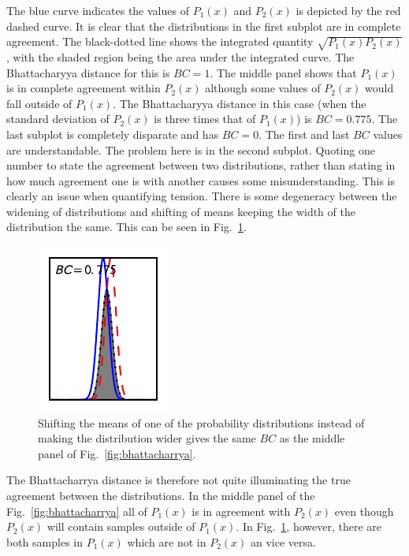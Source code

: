 \documentclass[twocolumn]{revtex4-1}
\begin{document}
    \noindent The blue curve indicates the values of $P_1(x)$ and $P_2(x)$ is depicted by the red dashed curve.
    It is clear that the distributions in the first subplot are in complete agreement.
    The black-dotted line shows the integrated quantity $\sqrt{P_1(x)P_2(x)}$, with the shaded region being the area under the integrated curve.
    The Bhattacharyya distance for this is $BC = 1$.
    The middle panel shows that $P_1(x)$ is in complete agreement within $P_2(x)$ although some values of $P_2(x)$ would fall outside of $P_1(x)$.
    The Bhattacharyya distance in this case (when the standard deviation of $P_2(x)$ is three times that of $P_1(x)$) is $BC = 0.775$. 
    The last subplot is completely disparate and has $BC = 0$.
    The first and last $BC$ values are understandable.
    The problem here is in the second subplot.
    Quoting one number to state the agreement between two distributions, rather than stating in how much agreement one is with another causes some misunderstanding.
    This is clearly an issue when quantifying tension.
    There is some degeneracy between the widening of distributions and shifting of means keeping the width of the distribution the same.
    This can be seen in Fig.~\ref{fig:bhattacharrya_2}.
    \begin{figure}
        \centering
        \includegraphics{../comparison/plots/Bhattacharrya_2.pdf}
        \caption{Shifting the means of one of the probability distributions instead of making the distribution wider gives the same $BC$ as the middle panel of Fig.~\ref{fig:bhattacharrya}.}
        \label{fig:bhattacharrya_2}
    \end{figure}
    \noindent The Bhattacharrya distance is therefore not quite illuminating the true agreement between the distributions.
    In the middle panel of the Fig.~\ref{fig:bhattacharrya} all of $P_1(x)$ is in agreement with $P_2(x)$ even though $P_2(x)$ will contain samples outside of $P_1(x)$.
    In Fig.~\ref{fig:bhattacharrya_2}, however, there are both samples in $P_1(x)$ which are not in $P_2(x)$ an vice versa.
\end{document}
